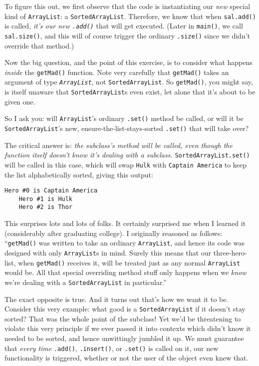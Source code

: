 To figure this out, we first observe that the code is instantiating our
\textit{new} special kind of \texttt{ArrayList}: a \texttt{SortedArrayList}.
Therefore, we know that when \texttt{sal.add()} is called, \textit{it's our
new \texttt{.add()}} that will get executed. (Later in \texttt{main()}, we
call \texttt{sal.size()}, and this will of course trigger the ordinary
\texttt{.size()} since we didn't override that method.)

Now the big question, and the point of this exercise, is to consider what
happens \textit{inside} the \texttt{getMad()} function. Note very carefully
that \texttt{getMad()} takes an argument of type \textit{\texttt{ArrayList}},
not \texttt{SortedArrayList}. So \texttt{getMad()}, you might say, is itself
unaware that \texttt{SortedArrayList}s even exist, let alone that it's about
to be given one.

So I ask you: will \texttt{ArrayList}'s ordinary \texttt{.set()} method be
called, or will it be \texttt{SortedArrayList}'s new,
ensure-the-list-stays-sorted \texttt{.set()} that will take over?

The critical answer is: \textit{the subclass's method will be called, even
though the function itself doesn't know it's dealing with a subclass.}
\texttt{SortedArrayList.set()} will be called in this case, which will swap
\texttt{Hulk} with \texttt{Captain America} to keep the list alphabetically
sorted, giving this output:

\begin{Verbatim}[fontsize=\small,samepage=true,frame=single]
    Hero #0 is Captain America
    Hero #1 is Hulk
    Hero #2 is Thor
\end{Verbatim}

This surprises lots and lots of folks. It certainly surprised me when I
learned it (considerably after graduating college). I originally reasoned as
follows: ``\texttt{getMad()} was written to take an ordinary
\texttt{ArrayList}, and hence its code was designed with only
\texttt{ArrayList}s in mind. Surely this means that our three-hero-list, when
\texttt{getMad()} receives it, will be treated just as any normal
\texttt{ArrayList} would be. All that special overriding method stuff only
happens when we \textit{know} we're dealing with a \texttt{SortedArrayList} in
particular.''

The exact opposite is true. And it turns out that's how we want it to be.
Consider this very example: what good is a \texttt{SortedArrayList} if it
doesn't stay sorted? That was the whole point of the subclass! Yet we'd be
threatening to violate this very principle if we ever passed it into contexts
which didn't know it needed to be sorted, and hence unwittingly jumbled it up.
We must guarantee that \textit{every time} \texttt{.add()},
\texttt{.insert()}, or \texttt{.set()} is called on it, our new functionality
is triggered, whether or not the user of the object even knew that.


